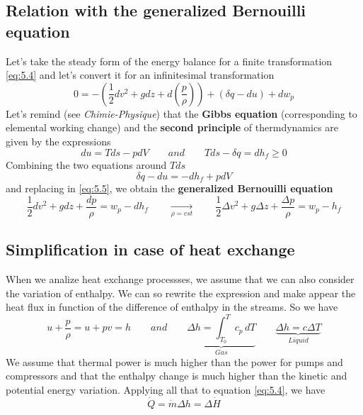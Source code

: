 	\subsection{Relation with the generalized Bernouilli equation}
		Let's take the steady form of the energy balance for a finite transformation \autoref{eq:5.4} and let's convert it for an infinitesimal transformation 
		\begin{equation}
			0 = - \left( \frac{1}{2}dv^2 + g dz + d\left(\frac{p}{\rho}\right) \right) + (\delta q - du) + dw_p
			\label{eq:5.5}
		\end{equation}
		Let's remind (see \emph{Chimie-Physique}) that the \textbf{Gibbs equation} (corresponding to elemental working change) and the \textbf{second principle} of thermdynamics are given by the expressions
		\begin{equation}
			du = Tds - pdV \qquad and \qquad Tds - \delta q= dh_f \geq 0
		\end{equation}
		Combining the two equations around $Tds$
		\begin{equation}
			\delta q - du = -dh_f + pdV
		\end{equation}
		and replacing in \autoref{eq:5.5}, we obtain the \textbf{generalized Bernouilli equation}
		\begin{equation}
			\frac{1}{2}dv^2 + g dz + \frac{dp}{\rho} = w_p - dh_f \qquad
			 \underset{\rho = cst}{\longrightarrow} \qquad 
			 \frac{1}{2}\Delta v^2 + g \Delta z + \frac{\Delta p}{\rho} = w_p - h_f 
		\end{equation}
		
	\subsection{Simplification in case of heat exchange}
		When we analize heat exchange processses, we assume that we can also consider the variation of enthalpy. We can so rewrite the expression and make appear the heat flux in function of the difference of enthalpy in the streams. So we have 
		\begin{equation}
			u + \frac{p}{\rho} = u + pv = h \qquad and \qquad \underbrace{\Delta h = \int _{T_0}^T c_p \, dT}_{Gas} \qquad \underbrace{\Delta h = c\Delta T}_{Liquid}
		\end{equation}
		We assume that thermal power is much higher than the power for pumps and compressors and that the enthalpy change is much higher than the kinetic and potential energy variation. Applying all that to equation \autoref{eq:5.4}, we have
		\begin{equation}
			\dot{Q} = \dot{m}\Delta h = \Delta \dot{H}
		\end{equation}
		
